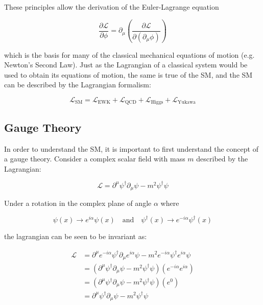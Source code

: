 \documentclass[12pt,a4paper,epsf,portrait,times,epsfig]{report}
\begin{document}
	These principles allow the derivation of the Euler-Lagrange equation

	\begin{equation}
		\frac{\partial\mathcal{L}}{\partial\phi}=\partial_{\mu}\left(\frac{\partial\mathcal{L}}{\partial(\partial_{\mu}\phi)}\right)
	\end{equation}

	which is the basis for many of the classical mechanical equations of motion (e.g. Newton's Second Law). Just as the Lagrangian of a classical system would be used to obtain its equations of motion, the same is true of the SM, and the SM can be described by the Lagrangian formalism:

	\begin{equation}
		\mathcal{L}_{\mathrm{SM}} = \mathcal{L}_{\mathrm{EWK}} + \mathcal{L}_{\mathrm{QCD}} + \mathcal{L}_{\mathrm{Higgs}} + \mathcal{L}_{\mathrm{Yukawa}}
	\end{equation}

	\subsection{Gauge Theory} \label{Section:GaugeTheory}

	In order to understand the SM, it is important to first understand the concept of a gauge theory. Consider a complex scalar field with mass $m$ described by the Lagrangian:

	\begin{equation}
		\mathcal{L} = \partial^{\mu} \psi^{\dagger} \partial_{\mu} \psi - m^{2}\psi^{\dagger}\psi
	\end{equation}

	Under a rotation in the complex plane of angle $\alpha$ where

	\begin{equation}
		\psi(x) \rightarrow e^{i\alpha}\psi(x)  
		\quad\mathrm{and}\quad
		\psi^{\dagger}(x) \rightarrow e^{-i\alpha}\psi^{\dagger}(x)
	\end{equation}

	the lagrangian can be seen to be invariant as:

	\begin{equation}
		\begin{split}
		\mathcal{L} &= \partial^{\mu}  e^{-i\alpha} \psi^{\dagger} \partial_{\mu} e^{i\alpha} \psi  - m^{2}e^{-i\alpha} \psi^{\dagger} e^{i\alpha}\psi  \\
		&= (\partial^{\mu} \psi^{\dagger} \partial_{\mu} \psi - m^{2}\psi^{\dagger}\psi)(e^{-i\alpha}e^{i\alpha}) \\ 
		&= (\partial^{\mu} \psi^{\dagger} \partial_{\mu} \psi - m^{2}\psi^{\dagger}\psi)(e^{0}) \\
		&= \partial^{\mu} \psi^{\dagger} \partial_{\mu} \psi - m^{2}\psi^{\dagger}\psi \\
		\end{split}
	\end{equation}
\end{document}
